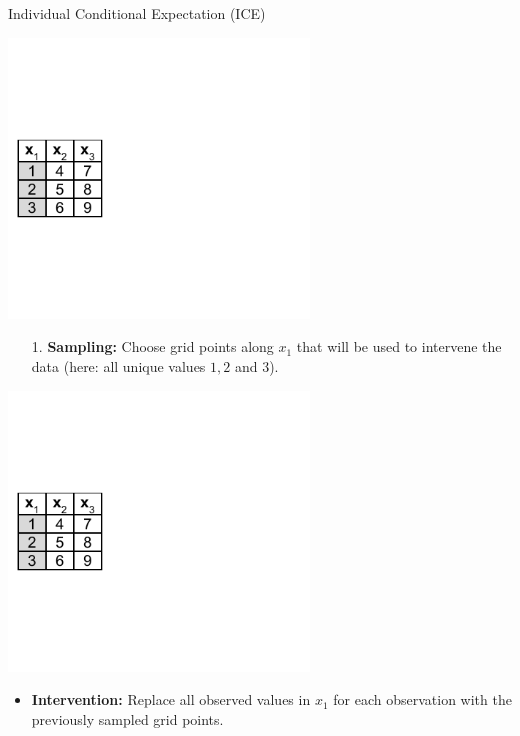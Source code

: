 \begin{vbframe}{Individual Conditional Expectation (ICE)}
\framebreak

\begin{center}
\includegraphics[page=1, width=0.6\textwidth]{figure_man/ice_pd_plot_demo}
\end{center}

\begin{itemize}
\item[1.] \textbf{Sampling:} Choose grid points along $x_1  $ that will be used to intervene the data (here: all unique values $1, 2$ and $3$).
\end{itemize}

\framebreak

\begin{center}
\includegraphics[page=2, width=0.6\textwidth]{figure_man/ice_pd_plot_demo}
\end{center}

\begin{itemize}
\item \textbf{Intervention:} Replace all observed values in $x_1$ for each observation with the previously sampled grid points.
\end{itemize}


\end{vbframe}
